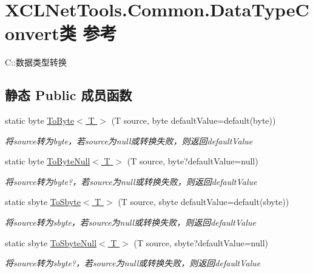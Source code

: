 \hypertarget{class_x_c_l_net_tools_1_1_common_1_1_data_type_convert}{}\section{X\+C\+L\+Net\+Tools.\+Common.\+Data\+Type\+Convert类 参考}
\label{class_x_c_l_net_tools_1_1_common_1_1_data_type_convert}


C\+::数据类型转换  


\subsection*{静态 Public 成员函数}
\begin{DoxyCompactItemize}
\item 
static byte \hyperlink{class_x_c_l_net_tools_1_1_common_1_1_data_type_convert_a71686d4590f91717c2f2fe9393466dbc}{To\+Byte$<$ T $>$} (T source, byte default\+Value=default(byte))
\begin{DoxyCompactList}\small\item\em 将source转为byte，若source为null或转换失败，则返回default\+Value \end{DoxyCompactList}\item 
static byte \hyperlink{class_x_c_l_net_tools_1_1_common_1_1_data_type_convert_a62e1bf3447e80205b377939f0888bbf8}{To\+Byte\+Null$<$ T $>$} (T source, byte?default\+Value=null)
\begin{DoxyCompactList}\small\item\em 将source转为byte?，若source为null或转换失败，则返回default\+Value \end{DoxyCompactList}\item 
static sbyte \hyperlink{class_x_c_l_net_tools_1_1_common_1_1_data_type_convert_abb4e728dc94f4198376274d06f46b0cf}{To\+Sbyte$<$ T $>$} (T source, sbyte default\+Value=default(sbyte))
\begin{DoxyCompactList}\small\item\em 将source转为sbyte，若source为null或转换失败，则返回default\+Value \end{DoxyCompactList}\item 
static sbyte \hyperlink{class_x_c_l_net_tools_1_1_common_1_1_data_type_convert_aea0c021384b87c5efd69313b13ae41d8}{To\+Sbyte\+Null$<$ T $>$} (T source, sbyte?default\+Value=null)
\begin{DoxyCompactList}\small\item\em 将source转为sbyte?，若source为null或转换失败，则返回default\+Value \end{DoxyCompactList}\item 

\end{DoxyCompactItemize}
